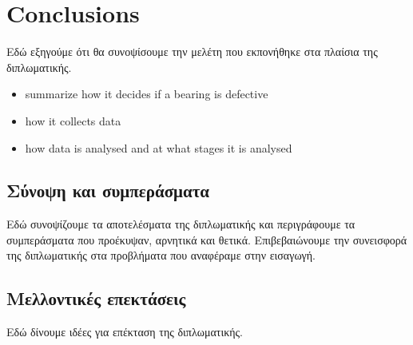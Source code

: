 \chapter{Conclusions}
\label{chap_last}
Εδώ εξηγούμε ότι θα συνοψίσουμε την μελέτη που εκπονήθηκε στα πλαίσια της διπλωματικής.
{
\begin{itemize}
\item summarize how it decides if a bearing is defective
\item how it collects data
\item how data is analysed and at what stages it is analysed
\end{itemize}
}

\section{Σύνοψη και συμπεράσματα}
Εδώ συνοψίζουμε τα αποτελέσματα της διπλωματικής και περιγράφουμε τα συμπεράσματα που προέκυψαν, αρνητικά και θετικά. Επιβεβαιώνουμε την συνεισφορά της διπλωματικής στα προβλήματα που αναφέραμε στην εισαγωγή.
{

}

\section{Μελλοντικές επεκτάσεις}
Εδώ δίνουμε ιδέες για επέκταση της διπλωματικής.
{

}
